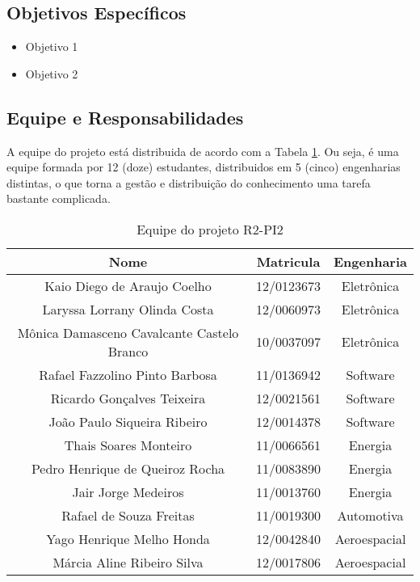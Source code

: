 \subsection{Objetivos Específicos} %
\label{sub:objetivos_específicos}
	
	\begin{itemize}
		\item Objetivo 1
		\item Objetivo 2
	\end{itemize}

\subsection{Equipe e Responsabilidades} %
\label{sub:equipe_e_responsabilidades}

	A equipe do projeto está distribuida de acordo com a Tabela \ref{tab:equipe}. Ou seja, é uma equipe formada por 12 (doze) estudantes, distribuidos em 5 (cinco) engenharias distintas, o que torna a gestão e distribuição do conhecimento uma tarefa bastante complicada.

	\begin{table}[H]
	\centering
	\caption{Equipe do projeto R2-PI2}
	\label{tab:equipe}
	\begin{tabular}{|c|c|c|}
	\hline
	\textbf{Nome}                              & \textbf{Matricula} & \textbf{Engenharia} \\ \hline
	Kaio Diego de Araujo Coelho                & 12/0123673         & Eletrônica          \\ \hline
	Laryssa Lorrany Olinda Costa               & 12/0060973         & Eletrônica          \\ \hline
	Mônica Damasceno Cavalcante Castelo Branco & 10/0037097         & Eletrônica          \\ \hline
	Rafael Fazzolino Pinto Barbosa             & 11/0136942         & Software            \\ \hline
	Ricardo Gonçalves Teixeira                 & 12/0021561         & Software            \\ \hline
	João Paulo Siqueira Ribeiro                & 12/0014378         & Software            \\ \hline
	Thais Soares Monteiro                      & 11/0066561         & Energia             \\ \hline
	Pedro Henrique de Queiroz Rocha            & 11/0083890         & Energia             \\ \hline
	Jair Jorge Medeiros                        & 11/0013760         & Energia             \\ \hline
	Rafael de Souza Freitas                    & 11/0019300         & Automotiva          \\ \hline
	Yago Henrique Melho Honda                  & 12/0042840         & Aeroespacial        \\ \hline
	Márcia Aline Ribeiro Silva                 & 12/0017806         & Aeroespacial        \\ \hline
	\end{tabular}
	\end{table}

